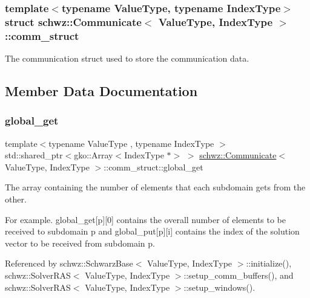 \subsubsection*{template$<$typename Value\+Type, typename Index\+Type$>$\newline
struct schwz\+::\+Communicate$<$ Value\+Type, Index\+Type $>$\+::comm\+\_\+struct}

The communication struct used to store the communication data. 

\subsection{Member Data Documentation}
\mbox{\label{structschwz_1_1Communicate_1_1comm__struct_a4df6a8d7932d277cfd4d8e8ec3ab7096}} 
\subsubsection{\texorpdfstring{global\+\_\+get}{global\_get}}
{\footnotesize\ttfamily template$<$typename Value\+Type , typename Index\+Type $>$ \\
std\+::shared\+\_\+ptr$<$gko\+::\+Array$<$Index\+Type $\ast$$>$ $>$ \hyperlink{classschwz_1_1Communicate}{schwz\+::\+Communicate}$<$ Value\+Type, Index\+Type $>$\+::comm\+\_\+struct\+::global\+\_\+get}



The array containing the number of elements that each subdomain gets from the other. 

For example. global\+\_\+get\mbox{[}p\mbox{]}\mbox{[}0\mbox{]} contains the overall number of elements to be received to subdomain p and global\+\_\+put\mbox{[}p\mbox{]}\mbox{[}i\mbox{]} contains the index of the solution vector to be received from subdomain p. 

Referenced by schwz\+::\+Schwarz\+Base$<$ Value\+Type, Index\+Type $>$\+::initialize(), schwz\+::\+Solver\+R\+A\+S$<$ Value\+Type, Index\+Type $>$\+::setup\+\_\+comm\+\_\+buffers(), and schwz\+::\+Solver\+R\+A\+S$<$ Value\+Type, Index\+Type $>$\+::setup\+\_\+windows().

\mbox{\label{structschwz_1_1Communicate_1_1comm__struct_a2fb26c3f0a44cf875080a8d36b082150}} 
